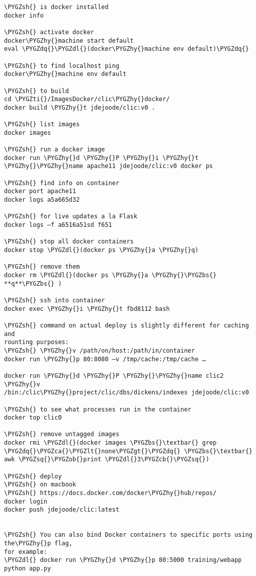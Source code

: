 \documentclass[letterpaper,10pt,english]{sphinxmanual}
\def\PYGZbs{\char`\\}
\def\PYGZob{\char`\{}
\def\PYGZcb{\char`\}}
\def\PYGZca{\char`\^}
\def\PYGZlt{\char`\<}
\def\PYGZgt{\char`\>}
\def\PYGZsh{\char`\#}
\def\PYGZdl{\char`\$}
\def\PYGZhy{\char`\-}
\def\PYGZsq{\char`\'}
\def\PYGZdq{\char`\"}
\def\PYGZti{\char`\~}
\renewcommand\PYGZsq{\textquotesingle}
\begin{document}
\begin{Verbatim}[commandchars=\\\{\}]
\PYGZsh{} is docker installed
docker info

\PYGZsh{} activate docker
docker\PYGZhy{}machine start default
eval \PYGZdq{}\PYGZdl{}(docker\PYGZhy{}machine env default)\PYGZdq{}

\PYGZsh{} to find localhost ping
docker\PYGZhy{}machine env default

\PYGZsh{} to build
cd \PYGZti{}/ImagesDocker/clic\PYGZhy{}docker/
docker build \PYGZhy{}t jdejoode/clic:v0 .

\PYGZsh{} list images
docker images

\PYGZsh{} run a docker image
docker run \PYGZhy{}d \PYGZhy{}P \PYGZhy{}i \PYGZhy{}t \PYGZhy{}\PYGZhy{}name apache11 jdejoode/clic:v0 docker ps

\PYGZsh{} find info on container
docker port apache11
docker logs a5a665d32

\PYGZsh{} for live updates a la Flask
docker logs –f a6516a51sd f651

\PYGZsh{} stop all docker containers
docker stop \PYGZdl{}(docker ps \PYGZhy{}a \PYGZhy{}q)

\PYGZsh{} remove them
docker rm \PYGZdl{}(docker ps \PYGZhy{}a \PYGZhy{}\PYGZbs{} **q**\PYGZbs{} )

\PYGZsh{} ssh into container
docker exec \PYGZhy{}i \PYGZhy{}t fbd8112 bash

\PYGZsh{} command on actual deploy is slightly different for caching and
rounting purposes:
\PYGZsh{} \PYGZhy{}v /path/on/host:/path/in/container
docker run \PYGZhy{}p 80:8080 –v /tmp/cache:/tmp/cache …

docker run \PYGZhy{}d \PYGZhy{}P \PYGZhy{}\PYGZhy{}name clic2 \PYGZhy{}v
/bin:/clic\PYGZhy{}project/clic/dbs/dickens/indexes jdejoode/clic:v0

\PYGZsh{} to see what processes run in the container
docker top clic0

\PYGZsh{} remove untagged images
docker rmi \PYGZdl{}(docker images \PYGZbs{}\textbar{} grep \PYGZdq{}\PYGZca{}\PYGZlt{}none\PYGZgt{}\PYGZdq{} \PYGZbs{}\textbar{} awk \PYGZsq{}\PYGZob{}print \PYGZdl{}3\PYGZcb{}\PYGZsq{})

\PYGZsh{} deploy
\PYGZsh{} on macbook
\PYGZsh{} https://docs.docker.com/docker\PYGZhy{}hub/repos/
docker login
docker push jdejoode/clic:latest


\PYGZsh{} You can also bind Docker containers to specific ports using the\PYGZhy{}p flag,
for example:
\PYGZdl{} docker run \PYGZhy{}d \PYGZhy{}p 80:5000 training/webapp python app.py
\end{Verbatim}
\end{document}
